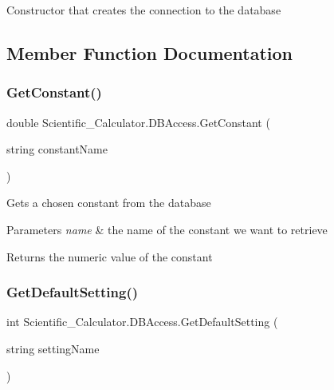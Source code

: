 Constructor that creates the connection to the database 



\subsection{Member Function Documentation}
\mbox{\label{class_scientific___calculator_1_1_d_b_access_a55b2251a50067b4008e03b911770cdf7}} 
\subsubsection{\texorpdfstring{Get\+Constant()}{GetConstant()}}
{\footnotesize\ttfamily double Scientific\+\_\+\+Calculator.\+D\+B\+Access.\+Get\+Constant (\begin{DoxyParamCaption}\item[{string}]{constant\+Name }\end{DoxyParamCaption})}



Gets a chosen constant from the database 


\begin{DoxyParams}{Parameters}
{\em name} & the name of the constant we want to retrieve\\
\hline
\end{DoxyParams}
\begin{DoxyReturn}{Returns}
the numeric value of the constant
\end{DoxyReturn}
\mbox{\label{class_scientific___calculator_1_1_d_b_access_a2b2a68c2a113ee7f4dabde92b4675d7e}} 
\subsubsection{\texorpdfstring{Get\+Default\+Setting()}{GetDefaultSetting()}}
{\footnotesize\ttfamily int Scientific\+\_\+\+Calculator.\+D\+B\+Access.\+Get\+Default\+Setting (\begin{DoxyParamCaption}\item[{string}]{setting\+Name }\end{DoxyParamCaption})}



